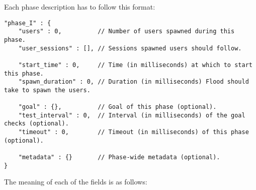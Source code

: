 \documentclass[a4paper]{article}
\begin{document}
\noindent
Each phase description has to follow this format:


\begin{verbatim}
"phase_I" : {
    "users" : 0,          // Number of users spawned during this phase.
    "user_sessions" : [], // Sessions spawned users should follow.

    "start_time" : 0,     // Time (in milliseconds) at which to start this phase.
    "spawn_duration" : 0, // Duration (in milliseconds) Flood should take to spawn the users.

    "goal" : {},          // Goal of this phase (optional).
    "test_interval" : 0,  // Interval (in milliseconds) of the goal checks (optional).
    "timeout" : 0,        // Timeout (in milliseconds) of this phase (optional).

    "metadata" : {}       // Phase-wide metadata (optional).
}
\end{verbatim}




\noindent
The meaning of each of the fields is as follows:
\end{document}

